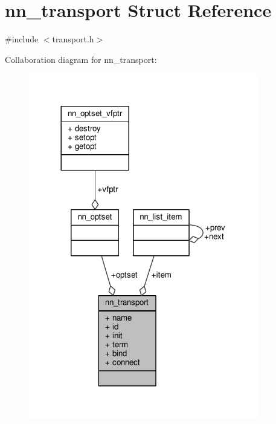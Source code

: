 \hypertarget{structnn__transport}{}\section{nn\+\_\+transport Struct Reference}
\label{structnn__transport}


{\ttfamily \#include $<$transport.\+h$>$}



Collaboration diagram for nn\+\_\+transport\+:\nopagebreak
\begin{figure}[H]
\begin{center}
\leavevmode
\includegraphics[width=284pt]{structnn__transport__coll__graph}
\end{center}
\end{figure}
